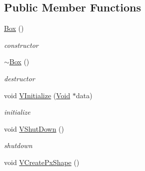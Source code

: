 \subsection*{Public Member Functions}
\begin{DoxyCompactItemize}
\item 
\hypertarget{classContent_1_1Shape_1_1Physics_1_1PhysX_1_1Box_a50e89418ffb4620cb4906a1e0c9ecebe}{
\hyperlink{classContent_1_1Shape_1_1Physics_1_1PhysX_1_1Box_a50e89418ffb4620cb4906a1e0c9ecebe}{Box} ()}
\label{classContent_1_1Shape_1_1Physics_1_1PhysX_1_1Box_a50e89418ffb4620cb4906a1e0c9ecebe}

\begin{DoxyCompactList}\small\item\em constructor \item\end{DoxyCompactList}\item 
\hypertarget{classContent_1_1Shape_1_1Physics_1_1PhysX_1_1Box_ab4bce6f09c614c191f1b1330b0e903fe}{
\hyperlink{classContent_1_1Shape_1_1Physics_1_1PhysX_1_1Box_ab4bce6f09c614c191f1b1330b0e903fe}{$\sim$Box} ()}
\label{classContent_1_1Shape_1_1Physics_1_1PhysX_1_1Box_ab4bce6f09c614c191f1b1330b0e903fe}

\begin{DoxyCompactList}\small\item\em destructor \item\end{DoxyCompactList}\item 
\hypertarget{classContent_1_1Shape_1_1Physics_1_1PhysX_1_1Box_a4089c4f9af4fa87fdd38597ab1626aaa}{
void \hyperlink{classContent_1_1Shape_1_1Physics_1_1PhysX_1_1Box_a4089c4f9af4fa87fdd38597ab1626aaa}{VInitialize} (\hyperlink{structVoid}{Void} $\ast$data)}
\label{classContent_1_1Shape_1_1Physics_1_1PhysX_1_1Box_a4089c4f9af4fa87fdd38597ab1626aaa}

\begin{DoxyCompactList}\small\item\em initialize \item\end{DoxyCompactList}\item 
\hypertarget{classContent_1_1Shape_1_1Physics_1_1PhysX_1_1Box_a3eacc5460961ff4c6fa699738be7a952}{
void \hyperlink{classContent_1_1Shape_1_1Physics_1_1PhysX_1_1Box_a3eacc5460961ff4c6fa699738be7a952}{VShutDown} ()}
\label{classContent_1_1Shape_1_1Physics_1_1PhysX_1_1Box_a3eacc5460961ff4c6fa699738be7a952}

\begin{DoxyCompactList}\small\item\em shutdown \item\end{DoxyCompactList}\item 
\hypertarget{classContent_1_1Shape_1_1Physics_1_1PhysX_1_1Box_a6eed1580910c294d8003db83252f055b}{
void \hyperlink{classContent_1_1Shape_1_1Physics_1_1PhysX_1_1Box_a6eed1580910c294d8003db83252f055b}{VCreatePxShape} ()}
\label{classContent_1_1Shape_1_1Physics_1_1PhysX_1_1Box_a6eed1580910c294d8003db83252f055b}


\end{DoxyCompactItemize}
